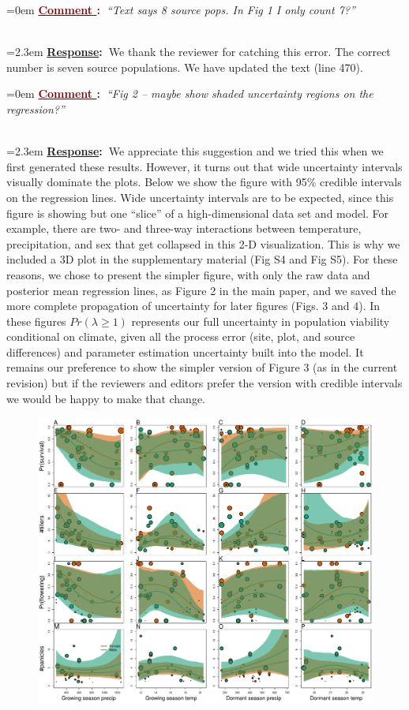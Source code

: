 \documentclass[12pt]{article}
\newcounter{cN}
\newcommand{\comment}[1]{
	\vspace{2em}
	\refstepcounter{cN} %
	\noindent \hangindent=0em \textbf{\textcolor{Maroon}{\uline{Comment \thecN}:~}}\emph{``#1''}
	}
\newcommand{\response}[1]{
	\\[0.25em]
	\hangindent=2.3em \textbf{\textcolor{NavyBlue}{\uline{Response}:~}}#1
	}
\begin{document}
\comment{Text says 8 source pops. In Fig 1 I only count 7?}
\response{We thank the reviewer for catching this error. 
The correct number is seven source populations. 
We have updated the text (line 470).}

\comment{Fig 2 – maybe show shaded uncertainty regions on the regression?}
\response{We appreciate this suggestion and we tried this when we first generated these results. However, it turns out that wide uncertainty intervals visually dominate the plots. 
Below we show the figure with 95\% credible intervals on the regression lines.
Wide uncertainty intervals are to be expected, since this figure is showing but one ``slice'' of a high-dimensional data set and model. 
For example, there are two- and three-way interactions between temperature, precipitation, and sex that get collapsed in this 2-D visualization. 
This is why we included a 3D plot in the supplementary material (Fig S4 and Fig  S5).
For these reasons, we chose to present the simpler figure, with only the raw data and posterior mean regression lines, as Figure 2 in the main paper, and we saved the more complete propagation of uncertainty for later figures (Figs. 3 and 4).
In these figures $Pr(\lambda \ge 1)$ represents our full uncertainty in population viability conditional on climate, given all the process error (site, plot, and source differences) and parameter estimation uncertainty built into the model. 
It remains our preference to show the simpler version of Figure 3 (as in the current revision) but if the reviewers and editors prefer the version with credible intervals we would be happy to make that change. 

\begin{figure}[h!]
	\centering
	\includegraphics[width=1\linewidth]{../../Figures/vital_rates_v1_r1.pdf}
	\label{fig:vital_rates}
\end{figure}
}
\end{document}

